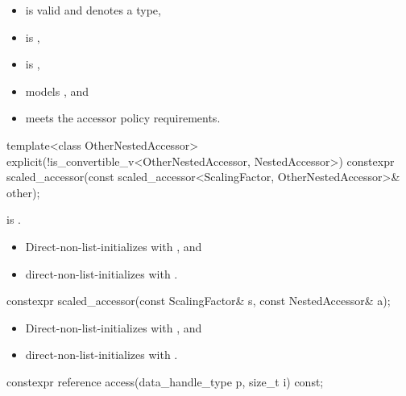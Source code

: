 \pnum
\mandates
\begin{itemize}
\item
{} is valid and denotes a type,
\item
{} is ,
\item
{} is ,
\item
{} models , and
\item
{} meets the accessor policy requirements.
\end{itemize}

\begin{itemdecl}
template<class OtherNestedAccessor>
  explicit(!is_convertible_v<OtherNestedAccessor, NestedAccessor>)
    constexpr scaled_accessor(const scaled_accessor<ScalingFactor, OtherNestedAccessor>& other);
\end{itemdecl}

\begin{itemdescr}
\pnum
\constraints
{} is .

\pnum
\effects
\begin{itemize}
\item
Direct-non-list-initializes 
with , and
\item
direct-non-list-initializes 
with .
\end{itemize}
\end{itemdescr}

\begin{itemdecl}
constexpr scaled_accessor(const ScalingFactor& s, const NestedAccessor& a);
\end{itemdecl}

\begin{itemdescr}
\pnum
\effects
\begin{itemize}
\item
Direct-non-list-initializes  with , and
\item
direct-non-list-initializes  with .
\end{itemize}
\end{itemdescr}

\begin{itemdecl}
constexpr reference access(data_handle_type p, size_t i) const;
\end{itemdecl}

